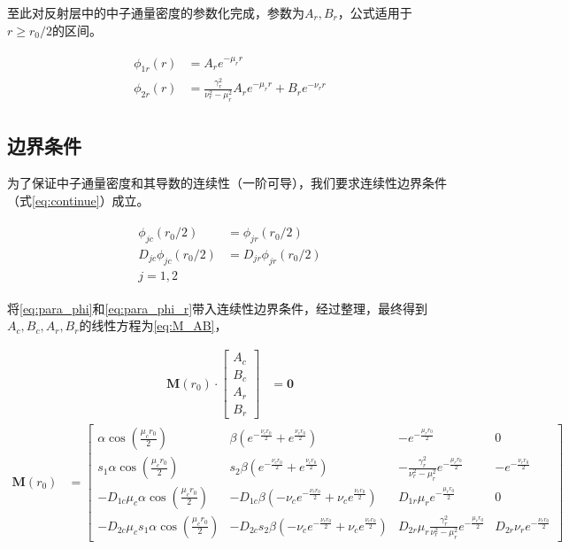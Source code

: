 至此对反射层中的中子通量密度的参数化完成，参数为$A_r,B_r$，公式适用于$r \geq r_0/2$的区间。

\begin{align}
    \label{eq:para_phi_r}
    \begin{split}
        \phi_{1r}(r) &= A_r e^{-\mu_r r} \\
        \phi_{2r}(r) &= \frac{\gamma_r^2}{\nu_r^2 - \mu_r^2}A_r e^{-\mu_r r} + B_r e^{-\nu_r r}
    \end{split}
\end{align}

\subsection{边界条件}

为了保证中子通量密度和其导数的连续性（一阶可导），我们要求连续性边界条件（式\ref{eq:continue}）成立。

\begin{align}
    \label{eq:continue}
    \begin{split}
        \phi_{jc}(r_0 / 2) &= \phi_{jr}(r_0 / 2) \\
        D_{jc}\phi_{jc}(r_0 / 2) &= D_{jr}\phi_{jr}(r_0 / 2) \\
        j = 1,2
    \end{split}
\end{align}

将\ref{eq:para_phi}和\ref{eq:para_phi_r}带入连续性边界条件，经过整理，最终得到$A_c,B_c,A_r,B_r$的线性方程为\ref{eq:M_AB}，

\begin{align}
    \label{eq:M_AB}
    \pmb{M}(r_0) \cdot \begin{bmatrix}
        A_c \\
        B_c \\
        A_r \\
        B_r
    \end{bmatrix} &= \pmb{0}
\end{align}
\begin{align}
    \pmb{M}(r_0) &= 
    \begin{bmatrix}
        \alpha\cos(\frac{\mu_c r_0}{2}) & \beta(e^{-\frac{\nu_c r_0}{2}}+e^{\frac{\nu_c r_0}{2}}) & -e^{-\frac{\mu_r r_0}{2}} & 0 \\
        s_1\alpha\cos(\frac{\mu_c r_0}{2}) & s_2\beta(e^{-\frac{\nu_c r_0}{2}}+e^{\frac{\nu_c r_0}{2}}) & -\frac{\gamma_r^2}{\nu_r^2 - \mu_r^2}e^{-\frac{\mu_r r_0}{2}} & -e^{-\frac{\nu_r r_0}{2}} \\
        -D_{1c}\mu_c\alpha\cos(\frac{\mu_c r_0}{2}) & -D_{1c}\beta(-\nu_c e^{-\frac{\nu_c r_0}{2}}+\nu_c e^{\frac{\nu_c r_0}{2}}) & D_{1r}\mu_r e^{-\frac{\mu_r r_0}{2}} & 0 \\
        -D_{2c}\mu_c s_1\alpha\cos(\frac{\mu_c r_0}{2}) & -D_{2c}s_2\beta(-\nu_c e^{-\frac{\nu_c r_0}{2}}+\nu_c e^{\frac{\nu_c r_0}{2}}) & D_{2r}\mu_r\frac{\gamma_r^2}{\nu_r^2 - \mu_r^2}e^{-\frac{\mu_r r_0}{2}} & D_{2r}\nu_r e^{-\frac{\nu_r r_0}{2}}
    \end{bmatrix}
\end{align}

